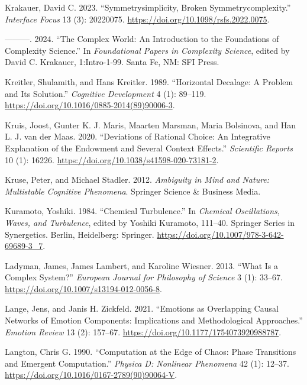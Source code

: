 \documentclass[
  a4paper,
  DIV=11,
  numbers=noendperiod,
  oneside]{scrreprt}
\newlength{\cslhangindent}
\newenvironment{CSLReferences}[2] %
 {\begin{list}{}{%
  \setlength{\itemindent}{0pt}
  \setlength{\leftmargin}{0pt}
  \setlength{\parsep}{0pt}
  \ifodd #1
   \setlength{\leftmargin}{\cslhangindent}
   \setlength{\itemindent}{-1\cslhangindent}
  \fi
  \setlength{\itemsep}{#2\baselineskip}}}
 {\end{list}}
\begin{document}
\begin{CSLReferences}{1}{0}
Krakauer, David C. 2023. {``Symmetry\textendash simplicity, Broken
Symmetry\textendash complexity.''} \emph{Interface Focus} 13 (3):
20220075. \url{https://doi.org/10.1098/rsfs.2022.0075}.

---------. 2024. {``The Complex World: An Introduction to the
Foundations of Complexity Science.''} In \emph{Foundational Papers in
Complexity Science}, edited by David C. Krakauer, 1:Intro-1-99. Santa
Fe, NM: SFI Press.

Kreitler, Shulamith, and Hans Kreitler. 1989. {``Horizontal Decalage:
{A} Problem and Its Solution.''} \emph{Cognitive Development} 4 (1):
89--119. \url{https://doi.org/10.1016/0885-2014(89)90006-3}.

Kruis, Joost, Gunter K. J. Maris, Maarten Marsman, Maria Bolsinova, and
Han L. J. van der Maas. 2020. {``Deviations of Rational Choice: An
Integrative Explanation of the Endowment and Several Context Effects.''}
\emph{Scientific Reports} 10 (1): 16226.
\url{https://doi.org/10.1038/s41598-020-73181-2}.

Kruse, Peter, and Michael Stadler. 2012. \emph{Ambiguity in {Mind} and
{Nature}: {Multistable Cognitive Phenomena}}. {Springer Science \&
Business Media}.

Kuramoto, Yoshiki. 1984. {``Chemical {Turbulence}.''} In \emph{Chemical
{Oscillations}, {Waves}, and {Turbulence}}, edited by Yoshiki Kuramoto,
111--40. Springer {Series} in {Synergetics}. {Berlin, Heidelberg}:
{Springer}. \url{https://doi.org/10.1007/978-3-642-69689-3_7}.

Ladyman, James, James Lambert, and Karoline Wiesner. 2013. {``What Is a
Complex System?''} \emph{European Journal for Philosophy of Science} 3
(1): 33--67. \url{https://doi.org/10.1007/s13194-012-0056-8}.

Lange, Jens, and Janis H. Zickfeld. 2021. {``Emotions as {Overlapping
Causal Networks} of {Emotion Components}: {Implications} and
{Methodological Approaches}.''} \emph{Emotion Review} 13 (2): 157--67.
\url{https://doi.org/10.1177/1754073920988787}.

Langton, Chris G. 1990. {``Computation at the Edge of Chaos: {Phase}
Transitions and Emergent Computation.''} \emph{Physica D: Nonlinear
Phenomena} 42 (1): 12--37.
\url{https://doi.org/10.1016/0167-2789(90)90064-V}.


\end{CSLReferences}
\end{document}
